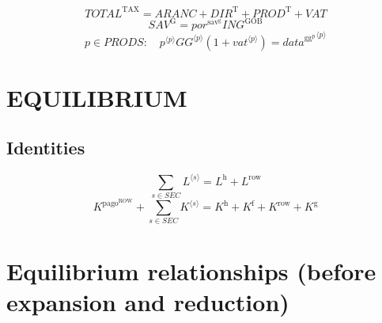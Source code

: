 \begin{equation}
{T\!O\!T\!A\!L}^{\mathrm{TAX}} = {A\!R\!A\!N\!C} + {D\!I\!R}^{\mathrm{T}} + {P\!R\!O\!D}^{\mathrm{T}} + {V\!A\!T}
\end{equation}
\begin{equation}
{S\!A\!V}^{\mathrm{G}} = {{p\!o\!r}^{\mathrm{sav}^{\mathrm{g}}}} {{I\!N\!G}^{\mathrm{GOB}}}
\end{equation}
\begin{equation}
p\in {P\!R\!O\!D\!S}\colon\quad {{p}^{\langle p\rangle}} {{{G\!G}}^{\langle p\rangle}} \left(1 + {{v\!a\!t}}^{\langle p\rangle}\right) = {{d\!a\!t\!a}^{\mathrm{gg}^{\mathrm{p}}}}^{\langle p\rangle}
\end{equation}




\section{EQUILIBRIUM}

\subsection{Identities}

\begin{equation}
\sum_{s\in {S\!E\!C}} {L}^{\langle s\rangle} = L^{\mathrm{h}} + L^{\mathrm{row}}
\end{equation}
\begin{equation}
K^{\mathrm{pago}^{\mathrm{ROW}}} + \sum_{s\in {S\!E\!C}} {K}^{\langle s\rangle} = K^{\mathrm{h}} + K^{\mathrm{f}} + K^{\mathrm{row}} + K^{\mathrm{g}}
\end{equation}




\section{Equilibrium relationships (before expansion and reduction)}

